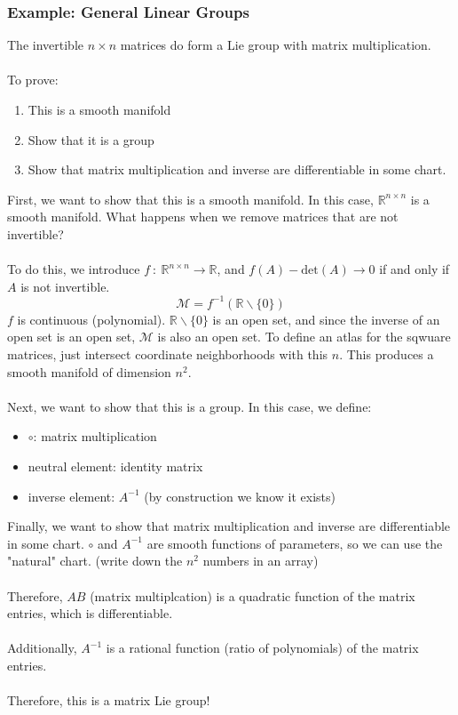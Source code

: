 \documentclass[10pt]{article}
\newcommand{\R}{\mathbb{R}}
\begin{document}
\subsubsection*{Example: General Linear Groups}
The invertible $n \times n$ matrices do form a Lie group with matrix multiplication.\\\\
To prove:
\begin{enumerate}
    \item This is a smooth manifold
    \item Show that it is a group
    \item Show that matrix multiplication and inverse are differentiable in some chart.
\end{enumerate}
First, we want to show that this is a smooth manifold.  In this case, $\R^{n \times n}$ is a smooth manifold.  What happens when we remove matrices that are not invertible?\\\\
To do this, we introduce $f \::\: \R^{n \times n} \rightarrow \R$, and $f(A) - \text{det}(A) \rightarrow 0$ if and only if $A$ is not invertible.
\[\mathcal{M} = f^{-1}(\R \backslash \{0\})\]
$f$ is continuous (polynomial).  $\R \backslash \{0\}$ is an open set, and since the inverse of an open set is an open set, $\mathcal{M}$ is also an open set.  To define an atlas for the sqwuare matrices, just intersect coordinate neighborhoods with this $n$.  This produces a smooth manifold of dimension $n^2$.\\\\
Next, we want to show that this is a group.  In this case, we define:
\begin{itemize}
    \item $\circ$: matrix multiplication
    \item neutral element: identity matrix
    \item inverse element: $A^{-1}$  (by construction we know it exists)
\end{itemize}
Finally, we want to show that matrix multiplication and inverse are differentiable in some chart.  $\circ$ and $A^{-1}$ are smooth functions of parameters, so we can use the "natural" chart.  (write down the $n^2$ numbers in an array)\\\\
Therefore, $AB$ (matrix multiplcation) is a quadratic function of the matrix entries, which is differentiable.\\\\
Additionally, $A^{-1}$ is a rational function (ratio of polynomials) of the matrix entries.\\\\
Therefore, this is a matrix Lie group!
\end{document}
